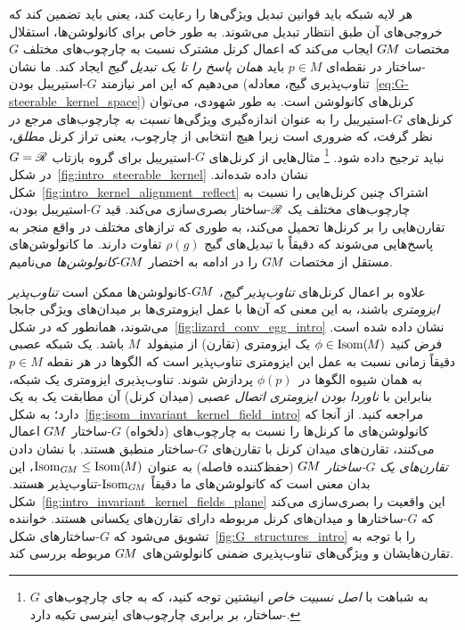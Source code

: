 هر لایه شبکه باید قوانین تبدیل ویژگی‌ها را رعایت کند، یعنی باید تضمین کند که خروجی‌های آن طبق انتظار تبدیل می‌شوند.
به طور خاص برای کانولوشن‌ها، استقلال مختصات $G\mkern-1.4muM$ ایجاب می‌کند که اعمال کرنل مشترک نسبت به چارچوب‌های مختلف $G$-ساختار در نقطه‌ای $p\in M$ باید \emph{همان پاسخ را تا یک تبدیل گیج} ایجاد کند.
ما نشان می‌دهیم که این امر نیازمند $G$-استیریبل بودن (تناوب‌پذیری گیج، معادله~\eqref{eq:G-steerable_kernel_space}) کرنل‌های کانولوشن است.
به طور شهودی، می‌توان کرنل‌های $G$-استیریبل را به عنوان اندازه‌گیری ویژگی‌ها \emph{نسبت به} چارچوب‌های مرجع در نظر گرفت، که ضروری است زیرا هیچ انتخابی از چارچوب، یعنی تراز کرنل \emph{مطلق}، نباید ترجیح داده شود.%
\footnote{
	به شباهت با \emph{اصل نسبیت خاص} انیشتین توجه کنید، که به جای چارچوب‌های $G$-ساختار، بر برابری چارچوب‌های اینرسی تکیه دارد.
}
مثال‌هایی از کرنل‌های $G$-استیریبل برای گروه بازتاب $G=\mathscr{R}$ در شکل~\ref{fig:intro_steerable_kernel} نشان داده شده‌اند.
شکل~\ref{fig:intro_kernel_alignment_reflect} اشتراک چنین کرنل‌هایی را نسبت به چارچوب‌های مختلف یک $\mathscr{R}$-ساختار بصری‌سازی می‌کند.
قید $G$-استیریبل بودن، تقارن‌هایی را بر کرنل‌ها تحمیل می‌کند، به طوری که ترازهای مختلف در واقع منجر به پاسخ‌هایی می‌شوند که دقیقاً با تبدیل‌های گیج $\rho(g)$ تفاوت دارند.
ما کانولوشن‌های مستقل از مختصات $G\mkern-1.4muM$ را در ادامه به اختصار $G\mkern-1.4muM$-\emph{کانولوشن‌ها} می‌نامیم.


علاوه بر اعمال کرنل‌های \emph{تناوب‌پذیر گیج}، $G\mkern-1.4muM$-کانولوشن‌ها ممکن است \emph{تناوب‌پذیر ایزومتری} باشند، به این معنی که آن‌ها با عمل ایزومتری‌ها بر میدان‌های ویژگی جابجا می‌شوند، همانطور که در شکل~\ref{fig:lizard_conv_egg_intro} نشان داده شده است.
فرض کنید $\phi \in \operatorname{Isom}(\mkern-1.5mu M \mkern-.5mu)$ یک ایزومتری (تقارن) از منیفولد~$M$ باشد.
یک شبکه عصبی دقیقاً زمانی نسبت به عمل این ایزومتری تناوب‌پذیر است که الگوها در هر نقطه $p\in M$ به همان شیوه الگوها در~$\phi(p)$ پردازش شوند.
تناوب‌پذیری ایزومتری یک شبکه، بنابراین با \emph{ناوردا بودن ایزومتری اتصال عصبی} (میدان کرنل) آن مطابقت یک به یک دارد؛ به شکل~\ref{fig:isom_invariant_kernel_field_intro} مراجعه کنید.
از آنجا که کانولوشن‌های ما کرنل‌ها را نسبت به چارچوب‌های (دلخواه) $G$-ساختار $G\mkern-1.4muM$ اعمال می‌کنند، تقارن‌های میدان کرنل با تقارن‌های $G$-ساختار منطبق هستند.
با نشان دادن \emph{تقارن‌های یک $G$-ساختار} $G\mkern-1.4muM$ (حفظ‌کننده فاصله) به عنوان 
$\operatorname{Isom}_{G\mkern-1.4muM} \leq \operatorname{Isom}(\mkern-1.5mu M \mkern-.5mu)$، این بدان معنی است که کانولوشن‌های ما دقیقاً $\operatorname{Isom}_{G\mkern-1.4muM}$-تناوب‌پذیر هستند.
شکل~\ref{fig:intro_invariant_kernel_fields_plane} این واقعیت را بصری‌سازی می‌کند که $G$-ساختارها و میدان‌های کرنل مربوطه دارای تقارن‌های یکسانی هستند.
خواننده تشویق می‌شود که $G$-ساختارهای شکل~\ref{fig:G_structures_intro} را با توجه به تقارن‌هایشان و ویژگی‌های تناوب‌پذیری ضمنی کانولوشن‌های $G\mkern-1.4muM$ مربوطه بررسی کند.


